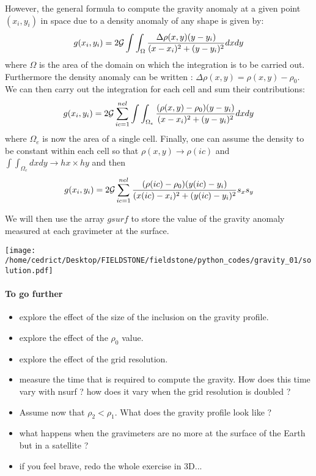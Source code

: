 However, the general formula to compute the gravity anomaly at a given point $(x_i,y_i)$ in space 
due to a density anomaly of any shape is given by:
\begin{equation}
g(x_i,y_i) = 2 {\cal G} \int\int_\Omega \frac{ \Delta \rho(x,y)  (y-y_i)}{(x-x_i)^2 + (y-y_i)^2  } dxdy
\end{equation}
where $\Omega$ is the area of the domain on which the integration is to be carried out. 
Furthermore the density anomaly can be written : $\Delta \rho (x,y)= \rho(x,y)-\rho_0$.
We can then carry out the integration for each cell and sum their contributions:
\begin{equation}
g(x_i,y_i) = 2 {\cal G} \sum_{ic=1}^{nel} \int\int_{\Omega_e} \frac{ (\rho(x,y) -\rho_0)  (y-y_i)}{(x-x_i)^2 + (y-y_i)^2  } dxdy
\end{equation}
where $\Omega_e$ is now the area of a single cell.
Finally, one can assume the density to be constant within each cell so that $\rho(x,y)\rightarrow \rho(ic)$
and $\int\int_{\Omega_e} dx dy \rightarrow hx \times hy$ and then 
\begin{equation}
g(x_i,y_i) = 2 {\cal G} \sum_{ic=1}^{nel} \frac{ (\rho(ic) -\rho_0)  (y(ic)-y_i)}{(x(ic)-x_i)^2 + (y(ic)-y_i)^2  } s_xs_y
\end{equation}

We will then use the array $gsurf$ to store the value of the gravity anomaly 
measured at each gravimeter at the surface. 

\begin{center}
\texttt{[image: /home/cedrict/Desktop/FIELDSTONE/fieldstone/python\_codes/gravity\_01/solution.pdf]}
\end{center}


\paragraph{To go further}

\begin{itemize}
\item explore the effect of the size of the inclusion on the gravity profile.
\item explore the effect of the $\rho_0$ value.
\item explore the effect of the grid resolution.
\item measure the time that is required to compute the gravity. 
How does this time vary with nsurf ? how does it vary when the grid resolution is doubled ?
\item Assume now that $\rho_2<\rho_1$. What does the gravity profile look like ?
\item what happens when the gravimeters are no more at the surface of the Earth but in a satellite ?
\item if you feel brave, redo the whole exercise in 3D...
\end{itemize}

